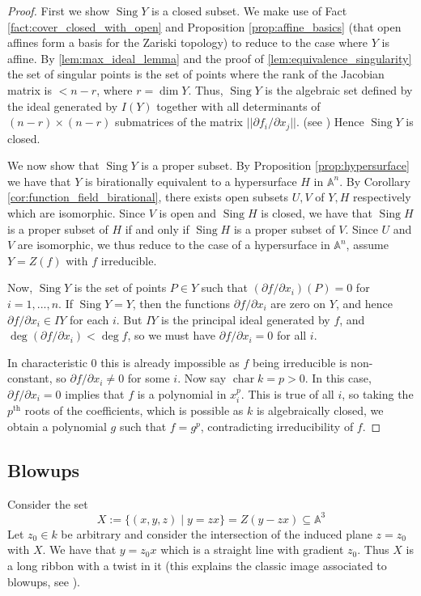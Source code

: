 \documentclass[12pt]{article}
\theoremstyle{plain}
\theoremstyle{definition}
\newcommand{\bb}[1]{\mathbb{#1}}
\begin{document}
\begin{proof}
First we show $\operatorname{Sing}Y$ is a closed subset.  We make use of Fact \ref{fact:cover_closed_with_open} and Proposition \ref{prop:affine_basics} (that open affines form a basis for the Zariski topology) to reduce to the case where $Y$ is affine.  By \ref{lem:max_ideal_lemma} and the proof of \eqref{lem:equivalence_singularity} the set of singular points is the set of points where the rank of the Jacobian matrix is $< n - r$, where $r = \operatorname{dim}Y$. Thus, $\operatorname{Sing}Y$ is the algebraic set defined by the ideal generated by $I(Y)$ together with all determinants of $(n - r) \times (n - r)$ submatrices of the matrix $||\partial f_i/\partial x_j||$. (see \cite{linear_algebra}) Hence $\operatorname{Sing}Y$ is closed.

We now show that $\operatorname{Sing}Y$ is a proper subset. By Proposition \ref{prop:hypersurface} we have that $Y$ is birationally equivalent to a hypersurface $H$ in $\bb{A}^n$. By Corollary \ref{cor:function_field_birational}, there exists open subsets $U,V$ of $Y,H$ respectively which are isomorphic. Since $V$ is open and $\operatorname{Sing}H$ is closed, we have that $\operatorname{Sing}H$ is a proper subset of $H$ if and only if $\operatorname{Sing}H$ is a proper subset of $V$. Since $U$ and $V$ are isomorphic, we thus reduce to the case of a hypersurface in $\bb{A}^n$, assume $Y = Z(f)$ with $f$ irreducible.

Now, $\operatorname{Sing}Y$ is the set of points $P \in Y$ such that $(\partial f/\partial x_i)(P) = 0$ for $i = 1,...,n$. If $\operatorname{Sing}Y = Y$, then the functions $\partial f/\partial x_i$ are zero on $Y$, and hence $\partial f/\partial x_i \in IY$ for each $i$. But $IY$ is the principal ideal generated by $f$, and $\operatorname{deg}(\partial f/\partial x_i) < \operatorname{deg}f$, so we must have $\partial f/\partial x_i = 0$ for all $i$.

In characteristic $0$ this is already impossible as $f$ being irreducible is non-constant, so $\partial f/\partial x_i \neq 0$ for some $i$. Now say $\operatorname{char}k = p > 0$. In this case, $\partial f/\partial x_i = 0$ implies that $f$ is a polynomial in $x_i^p$. This is true of all $i$, so taking the $p^{\text{th}}$ roots of the coefficients, which is possible as $k$ is algebraically closed, we obtain a polynomial $g$ such that $f = g^p$, contradicting irreducibility of $f$.
\end{proof}

\subsection{Blowups}
Consider the set
\[X := \lbrace (x,y,z) \mid y = zx\rbrace = Z(y - zx) \subseteq\bb{A}^3\]
Let $z_0 \in k$ be arbitrary and consider the intersection of the induced plane $z = z_0$ with $X$. We have that $y = z_0x$ which is a straight line with gradient $z_0$. Thus $X$ is a long ribbon with a twist in it (this explains the classic image associated to blowups, see \cite[\S I, 4]{hartshorne}).
\end{document}
